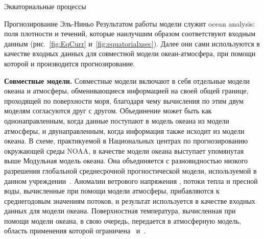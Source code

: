 \begin{chapter}{Экваториальные процессы}
\begin{section}{Прогнозирование Эль-Ниньо}
Результатом работы модели служит ocean analysis: поля плотности и течений, 
которые наилучшим образом соответствуют входным данным
(рис.~\ref{fig:EqCurr} и~\ref{fig:equatorialxsec}). Далее они сами используются
в качестве входных данных для совместной модели океан-атмосфера, при помощи
которой и производится прогнозирование.
%

\textbf{Совместные модели.} Совместные модели%
%
%
включают в себя отдельные модели океана и атмосферы, обменивающиеся информацией
на своей общей границе, проходящей по поверхности моря, благодаря чему
вычисления по этим двум моделям согласуются друг с другом. Объединение может
быть как однонаправленным, когда данные поступают в модель океана из модели
атмосферы, и двунаправленным, когда информация также исходит из модели океана.
В схеме, практикуемой в Национальных центрах по прогнозированию 
окружающей среды NOAA, в качестве модели океана выступает упомянутая выше
Модульная модель океана. Она объединяется с разновидностью низкого разрешения 
глобальной среднесрочной прогностической модели, используемой в данном 
учреждении~\cite{Kumar:1994}. 
Аномалии ветрового напряжения%
, потоки тепла и пресной воды, вычисленные
при помощи модели атмосферы, прибавляются к среднегодовым значениям потоков,
и результат используется в качестве входных данных для модели океана. 
Поверхностная температура, вычисленная при помощи модели океана, в свою
очередь, передается в атмосферную модель, область применения которой
ограничена~ и~.
%


\end{section}
\end{chapter}
